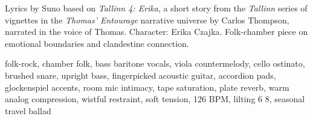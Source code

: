 

\begin{notes}
Lyrics by Suno based on \emph{Tallinn 4: Erika}, a short story from the \emph{Tallinn} series of vignettes in the \emph{Thomas’ Entourage} narrative universe by Carlos Thompson, narrated in the voice of Thomas. Character: Erika Czajka. Folk-chamber piece on emotional boundaries and clandestine connection.
\end{notes}

\begin{style}
folk-rock, chamber folk, bass baritone vocals, viola countermelody, cello ostinato, brushed snare, upright bass, fingerpicked acoustic guitar, accordion pads, glockenspiel accents, room mic intimacy, tape saturation, plate reverb, warm analog compression, wistful restraint, soft tension, 126 BPM, lilting 6 8, seasonal travel ballad
\end{style}


